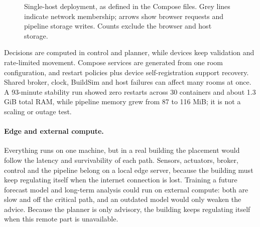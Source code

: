 \documentclass[11pt,a4paper]{article}
\begin{document}
\begin{figure}[H]
\caption{Single-host deployment, as defined in the Compose files. Grey lines indicate network membership; arrows show browser requests and pipeline storage writes. Counts exclude the browser and host storage.}\label{fig:deployment}
\end{figure}
Decisions are computed in control and planner, while devices keep validation and rate-limited movement. Compose services are generated from one room configuration, and restart policies plus device self-registration support recovery. Shared broker, clock, BuildSim and host failures can affect many rooms at once. A 93-minute stability run showed zero restarts across 30 containers and about 1.3 GiB total RAM, while pipeline memory grew from 87 to 116 MiB; it is not a scaling or outage test.

\paragraph{Edge and external compute.}
Everything runs on one machine, but in a real building the placement would follow the latency and survivability of each path. Sensors, actuators, broker, control and the pipeline belong on a local edge server, because the building must keep regulating itself when the internet connection is lost. Training a future forecast model and long-term analysis could run on external compute: both are slow and off the critical path, and an outdated model would only weaken the advice. Because the planner is only advisory, the building keeps regulating itself when this remote part is unavailable.
\end{document}

